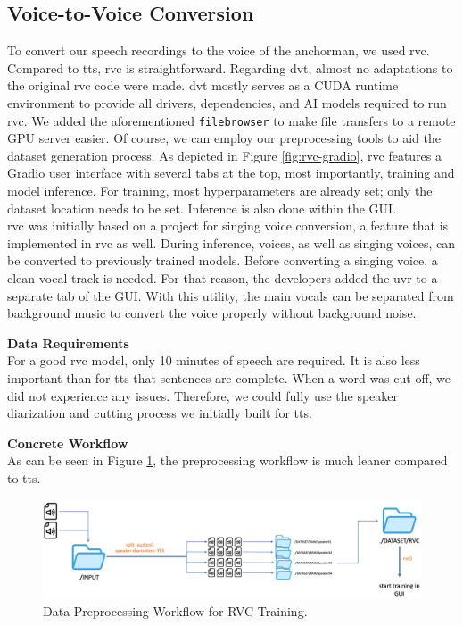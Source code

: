 \documentclass[
  a4paper,  %
  twoside,  %
  bibliography=totoc,
  headsepline,
  cleardoublepage=empty,
  parskip=half,
  draft=false
]{scrbook}
\begin{document}
\subsection{Voice-to-Voice Conversion}
To convert our speech recordings to the voice of the anchorman, we used \gls{rvc}. Compared to \gls{tts}, \gls{rvc} is straightforward. Regarding \gls*{dvt}, almost no adaptations to the original \gls*{rvc} \cite*{RVCProjectRetrievalbasedVoiceConversionWebUI2023} code were made. \gls*{dvt} mostly serves as a CUDA runtime environment to provide all drivers, dependencies, and AI models required to run \gls{rvc}. We added the aforementioned \verb|filebrowser| to make file transfers to a remote GPU server easier. Of course, we can employ our preprocessing tools to aid the dataset generation process. As depicted in Figure \ref{fig:rvc-gradio}, \gls{rvc} features a Gradio user interface with several tabs at the top, most importantly, training and model inference. For training, most hyperparameters are already set; only the dataset location needs to be set. Inference is also done within the GUI. \\
\gls{rvc} was initially based on a project for singing voice conversion, a feature that is implemented in \gls{rvc} as well. During inference, voices, as well as singing voices, can be converted to previously trained models. Before converting a singing voice, a clean vocal track is needed. For that reason, the developers added the \gls{uvr} to a separate tab of the GUI. With this utility, the main vocals can be separated from background music to convert the voice properly without background noise.

\textbf{Data Requirements} \\
For a good \gls{rvc} model, only 10 minutes of speech are required. It is also less important than for \gls{tts} that sentences are complete. When a word was cut off, we did not experience any issues. Therefore, we could fully use the speaker diarization and cutting process we initially built for \gls{tts}. 

\textbf{Concrete Workflow} \\
As can be seen in Figure \ref{fig:rvc-wf}, the preprocessing workflow is much leaner compared to \gls{tts}.
\begin{figure}[h]

  \centering
  \includegraphics[width=1\textwidth]{./graphics/rvc/rvc-workflow.png}
  \caption{Data Preprocessing Workflow for RVC Training.}
  \label{fig:rvc-wf}
\end{figure}
\end{document}

